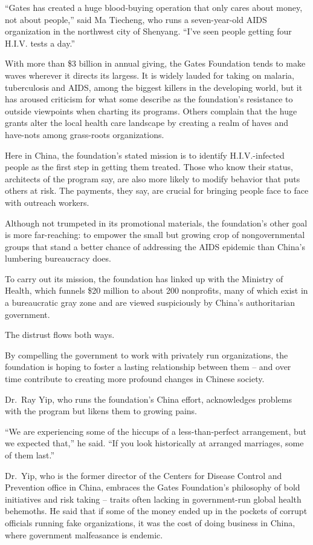 ﻿\documentclass[12pt]{article}
\begin{document}
``Gates has created a huge blood-buying operation that only cares about money, not about people,''
said Ma Tiecheng, who runs a seven-year-old AIDS organization in the northwest city of Shenyang.
``I've seen people getting four H.I.V. tests a day.''

With more than \$3 billion in annual giving, the Gates Foundation tends to make waves wherever it
directs its largess. It is widely lauded for taking on malaria, tuberculosis and AIDS, among the
biggest killers in the developing world, but it has aroused criticism for what some describe as the
foundation's resistance to outside viewpoints when charting its programs. Others complain that the
huge grants alter the local health care landscape by creating a realm of haves and have-nots among
grass-roots organizations.

Here in China, the foundation's stated mission is to identify H.I.V.-infected people as the first
step in getting them treated. Those who know their status, architects of the program say, are also
more likely to modify behavior that puts others at risk. The payments, they say, are crucial for
bringing people face to face with outreach workers.

Although not trumpeted in its promotional materials, the foundation's other goal is more
far-reaching: to empower the small but growing crop of nongovernmental groups that stand a better
chance of addressing the AIDS epidemic than China's lumbering bureaucracy does.

To carry out its mission, the foundation has linked up with the Ministry of Health, which funnels
\$20 million to about 200 nonprofits, many of which exist in a bureaucratic gray zone and are viewed
suspiciously by China's authoritarian government.

The distrust flows both ways.

By compelling the government to work with privately run organizations, the foundation is hoping to
foster a lasting relationship between them -- and over time contribute to creating more profound
changes in Chinese society.

Dr.~Ray Yip, who runs the foundation's China effort, acknowledges problems with the program but
likens them to growing pains.

``We are experiencing some of the hiccups of a less-than-perfect arrangement, but we expected
that,'' he said. ``If you look historically at arranged marriages, some of them last.''

Dr.~Yip, who is the former director of the Centers for Disease Control and Prevention office in
China, embraces the Gates Foundation's philosophy of bold initiatives and risk taking -- traits
often lacking in government-run global health behemoths. He said that if some of the money ended up
in the pockets of corrupt officials running fake organizations, it was the cost of doing business in
China, where government malfeasance is endemic.
\end{document}
